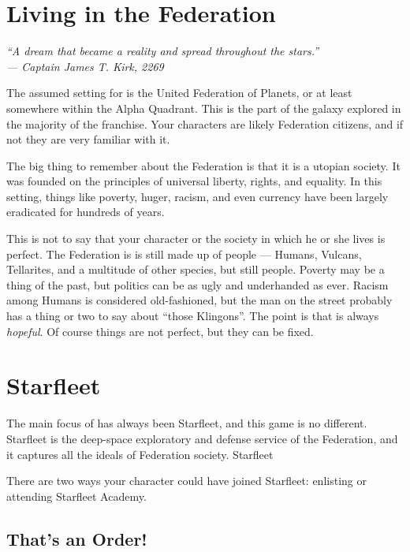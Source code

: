 \documentclass[12pt,titlepage,openany]{book}
\begin{document}
\section{Living in the Federation}

\begin{center}
\textit{``A dream that became a reality and spread throughout the stars.''\\
--- Captain James T. Kirk, 2269}
\end{center}

\noindent
The assumed setting for \StarTrekFate{} is the United Federation of Planets, or
at least somewhere within the Alpha Quadrant. This is the part of the galaxy
explored in the majority of the \StarTrek{} franchise. Your characters are
likely Federation citizens, and if not they are very familiar with it.

The big thing to remember about the Federation is that it is a utopian society.
It was founded on the principles of universal liberty, rights, and equality. In
this setting, things like poverty, huger, racism, and even currency have been
largely eradicated for hundreds of years.

This is not to say that your character or the society in which he or she lives
is perfect. The Federation is is still made up of people --- Humans, Vulcans,
Tellarites, and a multitude of other species, but still people. Poverty may be
a thing of the past, but politics can be as ugly and underhanded as ever.
Racism among Humans is considered old-fashioned, but the man on the street
probably has a thing or two to say about ``those Klingons''. The point is that
\StarTrek{} is always \emph{hopeful}. Of course things are not perfect, but
they can be fixed.

\section{Starfleet}

The main focus of \StarTrek{} has always been Starfleet, and this game is no
different. Starfleet is the deep-space exploratory and defense service of the
Federation, and it captures all the ideals of Federation society. Starfleet

There are two ways your character could have joined Starfleet: enlisting or
attending Starfleet Academy.

\subsection*{That's an Order!}\label{subsec:orders}
\end{document}
